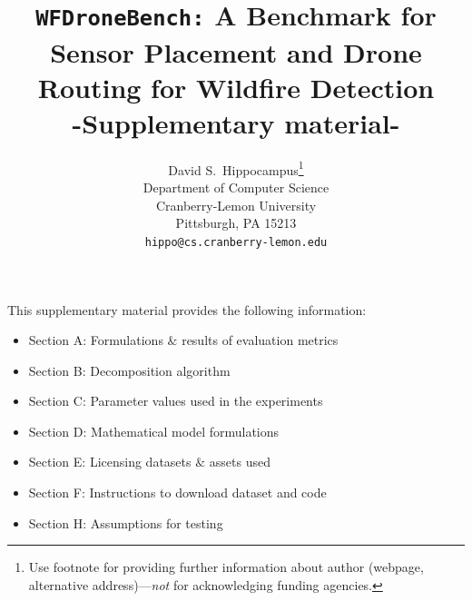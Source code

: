 \documentclass{article}
\title{\texttt{WFDroneBench:} A Benchmark for Sensor Placement and Drone Routing for Wildfire Detection \\
-Supplementary material-}
\author{%
  David S.~Hippocampus\thanks{Use footnote for providing further information
    about author (webpage, alternative address)---\emph{not} for acknowledging
    funding agencies.} \\
  Department of Computer Science\\
  Cranberry-Lemon University\\
  Pittsburgh, PA 15213 \\
  \texttt{hippo@cs.cranberry-lemon.edu} \\
}
\begin{document}
\maketitle

This supplementary material provides the following information:
\begin{itemize}
    \item Section A: Formulations $\&$ results of evaluation metrics
    \item Section B: Decomposition algorithm
    \item Section C: Parameter values used in the experiments
    \item Section D: Mathematical model formulations
    \item Section E: Licensing datasets $\&$ assets used
    \item Section F: Instructions to download dataset and code
    \item Section H: Assumptions for testing
\end{itemize}

\end{document}

